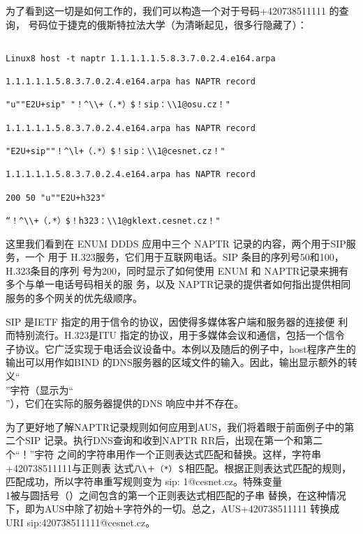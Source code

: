为了看到这一切是如何工作的，我们可以构造一个对于号码+420738511111 的查询，
号码位于捷克的俄斯特拉法大学（为清晰起见，很多行隐藏了）：

\begin{verbatim}
    
Linux8 host -t naptr 1.1.1.1.1.5.8.3.7.0.2.4.e164.arpa

1.1.1.1.1.5.8.3.7.0.2.4.e164.arpa has NAPTR record

"u""E2U+sip" "！^\\+（.*）$！sip：\\1@osu.cz！"

1.1.1.1.1.5.8.3.7.0.2.4.e164.arpa has NAPTR record

"E2U+sip""！^\l+（.*）$！sip：\\1@cesnet.cz！"

1.1.1.1.1.5.8.3.7.0.2.4.e164.arpa has NAPTR record

200 50 "u""E2U+h323"

“！^\\+（.*）$！h323：\\1@gklext.cesnet.cz！"
\end{verbatim}

这里我们看到在 ENUM DDDS 应用中三个 NAPTR 记录的内容，两个用于SIP服务，一个
用于 H.323服务，它们用于互联网电话。SIP 条目的序列号50和100，H.323条目的序列
号为200，同时显示了如何使用 ENUM 和 NAPTR记录来拥有多个与单一电话号码相关的服
务，以及 NAPTR记录的提供者如何指出提供相同服务的多个网关的优先级顺序。

\begin{tcolorbox}
    SIP 是IETF 指定的用于信令的协议，因使得多媒体客户端和服务器的连接便
    利而特别流行。H.323是ITU 指定的协议，用于多媒体会议和通信，包括一个信令
    子协议。它广泛实现于电话会议设备中。本例以及随后的例子中，host程序产生的
    输出可以用作如BIND 的DNS服务器的区域文件的输入。因此，输出显示额外的转
    义“\\”宇符（显示为“\\”），它们在实际的服务器提供的DNS 响应中并不存在。
\end{tcolorbox}

为了更好地了解NAPTR记录规则如何应用到AUS，我们将着眼于前面例子中的第
二个SIP 记录。执行DNS查询和收到NAPTR RR后，出现在第一个和第二个“！”宇符
之间的字符串用作一个正则表达式匹配和替换。这样，字符串+420738511111与正则表
达式\verb|八\＋（*）＄|相匹配。根据正则表达式匹配的规则，匹配成功，所以字符串重写规则变为
sip: 1@cesnet.cz。特殊变量\\1被与圆括号（）之间包含的第一个正则表达式相匹配的子串
替换，在这种情况下，即为AUS中除了初始＋字符外的一切。总之，AUS+420738511111
转换成 URI sip:420738511111@cesnet.cz。


